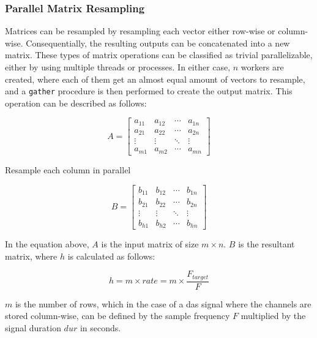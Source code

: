 \subsubsection{Parallel Matrix Resampling}

Matrices can be resampled by resampling each vector either row-wise or column-wise. Consequentially, the resulting outputs can be concatenated into a new matrix. These types of matrix operations can be classified as trivial parallelizable, either by using multiple threads or processes. In either case, $n$ workers are created, where each of them get an almost equal amount of vectors to resample, and a \texttt{gather} procedure is then performed to create the output matrix. This operation can be described as follows:


\[
A = \begin{bmatrix}
a_{11} & a_{12} & \cdots & a_{1n} \\
a_{21} & a_{22} & \cdots & a_{2n} \\
\vdots & \vdots & \ddots & \vdots \\
a_{m1} & a_{m2} & \cdots & a_{mn}
\end{bmatrix}
\]


\begin{center}
Resample each column in parallel
\end{center}


\[
B = \begin{bmatrix}
b_{11} & b_{12} & \cdots & b_{1n} \\
b_{21} & b_{22} & \cdots & b_{2n} \\
\vdots & \vdots & \ddots & \vdots \\
b_{h1} & b_{h2} & \cdots & b_{hn}
\end{bmatrix}
\]

In the equation above, $A$ is the input matrix of size $m \times n$.  $B$ is the resultant matrix, where $h$ is calculated as follows: 

$$h = m \times rate = m \times \dfrac{F_{target}}{F}$$

$m$ is the number of rows, which in the case of a \acrshort{das} signal where the channels are stored column-wise, can be defined by the sample frequency $F$ multiplied by the signal duration $dur$ in seconds.